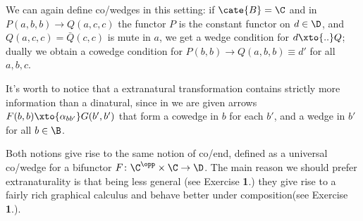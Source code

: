 \begin{remark}
We can again define co/wedges in this setting: if $\cate{B}=\C$ and in $P(a,b,b)\to Q(a,c,c)$ the functor $P$ is the constant functor on $d\in\D$, and $Q(a,c,c)=\bar Q(c,c)$ is mute in $a$, we get a wedge condition for $d\xto{..}Q$; dually we obtain a cowedge condition for $P(b,b)\to Q(a,b,b)\equiv d'$ for all $a,b,c$. 

It's worth to notice that a extranatural transformation contains strictly more information than a dinatural, since in \adef{} we are given arrows $F(b,b) \xto{\alpha_{bb'}} G(b',b')$ that form a cowedge in $b$ for each $b'$, and a wedge in $b'$ for all $b\in\B$.
\end{remark}
Both notions give rise to the same notion of co/end, defined as a universal co/wedge for a bifunctor $F\colon \C^\opp\times\C\to \D$. The main reason we should prefer extranaturality is that being less general (see Exercise \textbf{1}.) they give rise to a fairly rich graphical calculus and behave better under composition(see Exercise \textbf{1}.).


